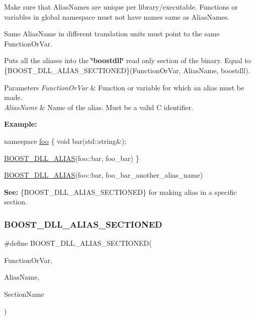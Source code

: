 Make sure that Alias\+Names are unique per library/executable. Functions or variables in global namespace must not have names same as Alias\+Names.

Same Alias\+Name in different translation units must point to the same Function\+Or\+Var.

Puts all the aliases into the {\bfseries \char`\"{}boostdll\char`\"{}} read only section of the binary. Equal to \{B\+O\+O\+S\+T\+\_\+\+D\+L\+L\+\_\+\+A\+L\+I\+A\+S\+\_\+\+S\+E\+C\+T\+I\+O\+N\+ED\}(Function\+Or\+Var, Alias\+Name, boostdll).


\begin{DoxyParams}{Parameters}
{\em Function\+Or\+Var} & Function or variable for which an alias must be made. \\
\hline
{\em Alias\+Name} & Name of the alias. Must be a valid C identifier.\\
\hline
\end{DoxyParams}
{\bfseries Example\+:} 
\begin{DoxyCode}
\textcolor{keyword}{namespace }\hyperlink{a01792}{foo} \{
  \textcolor{keywordtype}{void} bar(std::string&);

  \hyperlink{a00200_ad9f8b1de81ae3b24cd938c7bacb27eef}{BOOST\_DLL\_ALIAS}(foo::bar, foo\_bar)
\}

\hyperlink{a00200_ad9f8b1de81ae3b24cd938c7bacb27eef}{BOOST\_DLL\_ALIAS}(foo::bar, foo\_bar\_another\_alias\_name)
\end{DoxyCode}


{\bfseries See\+:} \{B\+O\+O\+S\+T\+\_\+\+D\+L\+L\+\_\+\+A\+L\+I\+A\+S\+\_\+\+S\+E\+C\+T\+I\+O\+N\+ED\} for making alias in a specific section. \mbox{\label{a00200_af10683bc3be11abe1957b186fcec2bd2}} 
\subsubsection{\texorpdfstring{B\+O\+O\+S\+T\+\_\+\+D\+L\+L\+\_\+\+A\+L\+I\+A\+S\+\_\+\+S\+E\+C\+T\+I\+O\+N\+ED}{BOOST\_DLL\_ALIAS\_SECTIONED}}
{\footnotesize\ttfamily \#define B\+O\+O\+S\+T\+\_\+\+D\+L\+L\+\_\+\+A\+L\+I\+A\+S\+\_\+\+S\+E\+C\+T\+I\+O\+N\+ED(\begin{DoxyParamCaption}\item[{}]{Function\+Or\+Var,  }\item[{}]{Alias\+Name,  }\item[{}]{Section\+Name }\end{DoxyParamCaption})}

